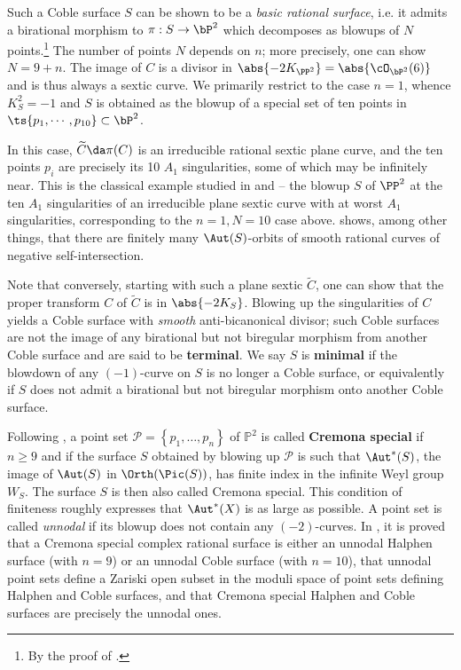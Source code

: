 \documentclass[../../main.tex]{subfiles}
\begin{document}
\begin{remark}
Such a Coble surface $S$ can be shown to be a \textit{basic rational surface}, i.e. it admits a birational morphism to $\pi: S\to \bP^2$ which decomposes as blowups of $N$ points.\footnote{By the proof of \cite[Prop 9.13]{DK24}.} The number of points $N$ depends on $n$; more precisely, one can show $N = 9+n$. The image of $C$ is a divisor in $\abs{-2K_{\PP^2}} = \abs{\cO_{\bP^2}(6)}$ and is thus always a sextic curve. We primarily restrict to the case $n=1$, whence $K_S^2=-1$ and $S$ is obtained as the blowup of a special set of ten points in $\ts{p_1,\cdots, p_{10}} \subset \bP^2$. 

In this case, $\tilde C \da \pi(C)$ is an irreducible rational sextic plane curve, and the ten points $p_i$ are precisely its 10 $A_1$ singularities, some of which may be infinitely near. This is the classical example studied in \cite{Cob19} and \cite{Cob29} -- the blowup $S$ of $\PP^2$ at the ten $A_1$ singularities of an irreducible plane sextic curve with at worst $A_1$ singularities,  corresponding to the $n=1, N=10$ case above. \cite{Cob19} shows, among other things, that there are finitely many $\Aut(S)$-orbits of smooth rational curves of negative self-intersection.

Note that conversely, starting with such a plane sextic $\tilde C$, one can show that the proper transform $C$ of $\tilde C$ is in $\abs{-2K_S}$. Blowing up the singularities of $C$ yields a Coble surface with \textit{smooth} anti-bicanonical divisor; such Coble surfaces are not the image of any birational but not biregular morphism from another Coble surface and are said to be \textbf{terminal}. We say $S$ is \textbf{minimal} if the blowdown of any $(-1)$-curve on $S$ is no longer a Coble surface, or equivalently if $S$ does not admit a birational but not biregular morphism onto another Coble surface.
\end{remark}

\begin{remark}
Following \cite[\S 1.4]{CD12}, a point set $\mathcal{P}=\left\{p_{1}, \ldots, p_{n}\right\}$ of $\mathbb{P}^{2}$ is called \textbf{Cremona special} if $n \geq 9$ and if the surface $S$ obtained by blowing up $\mathcal{P}$ is such that $\Aut^*(S)$, the image of $\Aut(S)$ in $\Orth(\Pic(S))$, has finite index in the infinite Weyl group $W_{S}$. The surface $S$ is then also called Cremona special. This condition of finiteness roughly expresses that $\Aut^*(X)$ is as large as possible. A point set is called \textit{unnodal} if its blowup does not contain any $(-2)$-curves. In \cite{CD12}, it is proved that a Cremona special complex rational surface is either an unnodal Halphen surface (with $n=9$) or an unnodal Coble surface (with $n=10$), that unnodal point sets define a Zariski open subset in the moduli space of point sets defining Halphen and Coble surfaces, and that Cremona special Halphen and Coble surfaces are precisely the unnodal ones.
\end{remark}
\end{document}
